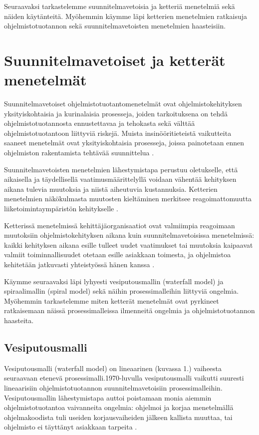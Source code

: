\documentclass[finnish]{tktltiki2}
\theoremstyle{definition}
\theoremstyle{remark}
\begin{document}
Seuraavaksi tarkastelemme suunnitelmavetoisia ja ketteriä menetelmiä sekä näiden käytänteitä. Myöhemmin käymme läpi ketterien menetelmien ratkaisuja ohjelmistotuotannon sekä suunnitelmavetoisten menetelmien haasteisiin.

\section{Suunnitelmavetoiset ja ketterät menetelmät}

Suunnitelmavetoiset ohjelmistotuotantomenetelmät ovat ohjelmistokehityksen yksityiskohtaisia ja kurinalaisia prosesseja, joiden tarkoituksena on tehdä ohjelmistotuotannosta ennustettavaa ja tehokasta sekä välttää ohjelmistotuotantoon liittyviä riskejä. Muista insinööritieteistä vaikutteita saaneet menetelmät ovat yksityiskohtaisia prosesseja, joissa painotetaan ennen ohjelmiston rakentamista tehtävää  suunnittelua \cite{FOW01a}.

Suunnitelmavetoisten menetelmien lähestymistapa perustuu oletukselle, että aikaisella ja täydellisellä vaatimusmäärittelyllä voidaan vähentää kehityksen aikana tulevia muutoksia ja niistä aiheutuvia kustannuksia. Ketterien menetelmien näkökulmasta muutosten kieltäminen merkitsee reagoimattomuutta liiketoimintaympäristön kehitykselle \cite{HIC01}.

Ketterissä menetelmissä kehittäjäorganisaatiot ovat valmiimpia reagoimaan muutoksiin ohjelmistokehityksen aikana kuin suunnitelmavetoisissa menetelmissä: kaikki kehityksen aikana esille tulleet uudet vaatimukset tai muutoksia kaipaavat valmiit toiminnallisuudet otetaan esille asiakkaan toimesta, ja ohjelmistoa kehitetään jatkuvasti yhteistyössä hänen kanssa \cite{WIC03}.

Käymme seuraavaksi läpi lyhyesti vesiputousmallin (waterfall model) ja spiraalimallin (spiral model) sekä näihin prosessimalleihin liittyviä ongelmia. Myöhemmin tarkastelemme miten ketterät menetelmät ovat pyrkineet ratkaisemaan näissä prosessimalleissa ilmenneitä ongelmia ja ohjelmistotuotannon haasteita.

\subsection{Vesiputousmalli}

Vesiputousmalli (waterfall model) on lineaarinen (kuvassa 1.) vaiheesta seuraavaan etenevä prosessimalli.1970-luvulla vesiputousmalli vaikutti suuresti lineaarisiin ohjelmistotuotannon suunnitelmavetoisiin prosessimalleihin. Vesiputousmallin lähestymistapa auttoi poistamaan monia aiemmin ohjelmistotuotantoa vaivanneita ongelmia: ohjelmoi ja korjaa menetelmällä ohjelmakoodista tuli useiden korjausvaiheiden jälkeen kallista muuttaa, tai ohjelmisto ei täyttänyt asiakkaan tarpeita   \cite{BOE88}.
\end{document}
